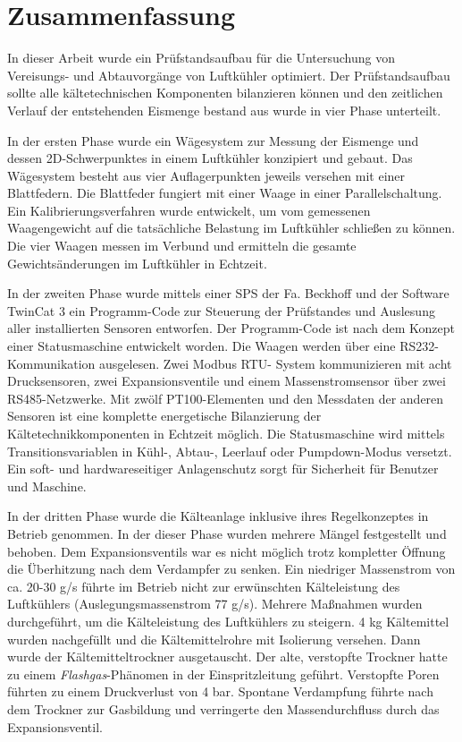 \chapter{Zusammenfassung}
\label{cha:Zusammenfassung}

In dieser Arbeit wurde ein Prüfstandsaufbau für die Untersuchung von Vereisungs- und Abtauvorgänge von Luftkühler optimiert. Der Prüfstandsaufbau sollte alle kältetechnischen Komponenten bilanzieren können und den zeitlichen Verlauf der entstehenden Eismenge  bestand aus wurde in vier Phase unterteilt. 

In der ersten Phase wurde ein Wägesystem zur Messung der Eismenge und dessen 2D-Schwerpunktes in einem Luftkühler konzipiert und gebaut. Das Wägesystem besteht aus vier Auflagerpunkten jeweils versehen mit einer Blattfedern. Die Blattfeder fungiert mit einer Waage in einer Parallelschaltung. Ein Kalibrierungsverfahren wurde entwickelt, um vom gemessenen Waagengewicht auf die tatsächliche Belastung im Luftkühler schließen zu können.
Die vier Waagen messen im Verbund und ermitteln die gesamte Gewichtsänderungen im Luftkühler in Echtzeit. 

In der zweiten Phase wurde mittels einer SPS der Fa. Beckhoff und der Software TwinCat 3 ein Programm-Code zur Steuerung der Prüfstandes und Auslesung aller installierten Sensoren entworfen. Der Programm-Code ist nach dem Konzept einer Statusmaschine entwickelt worden. Die Waagen werden über eine RS232-Kommunikation ausgelesen. Zwei Modbus RTU- System kommunizieren mit acht Drucksensoren, zwei Expansionsventile und einem Massenstromsensor über zwei RS485-Netzwerke. Mit zwölf PT100-Elementen und den Messdaten der anderen Sensoren ist eine komplette energetische Bilanzierung der Kältetechnikkomponenten in Echtzeit möglich. 
Die Statusmaschine wird mittels Transitionsvariablen in Kühl-, Abtau-, Leerlauf oder Pumpdown-Modus versetzt. Ein soft- und hardwareseitiger Anlagenschutz sorgt für Sicherheit für Benutzer und Maschine. 

In der dritten Phase wurde die Kälteanlage inklusive ihres Regelkonzeptes in Betrieb genommen. In der dieser Phase wurden mehrere Mängel festgestellt und behoben. Dem Expansionsventils war es nicht möglich trotz kompletter Öffnung die Überhitzung nach dem Verdampfer zu senken. Ein niedriger Massenstrom von ca. 20-30 g/s führte im Betrieb nicht zur erwünschten Kälteleistung des Luftkühlers (Auslegungsmassenstrom 77 g/s). Mehrere Maßnahmen wurden durchgeführt, um die Kälteleistung des Luftkühlers zu steigern. 4 kg Kältemittel wurden nachgefüllt und die Kältemittelrohre mit Isolierung versehen.  Dann wurde der Kältemitteltrockner ausgetauscht. Der alte, verstopfte Trockner hatte zu einem \textit{Flashgas}-Phänomen in der Einspritzleitung geführt. Verstopfte Poren führten zu einem Druckverlust von 4 bar. Spontane Verdampfung führte nach dem Trockner zur Gasbildung und verringerte den Massendurchfluss durch das Expansionsventil. 

